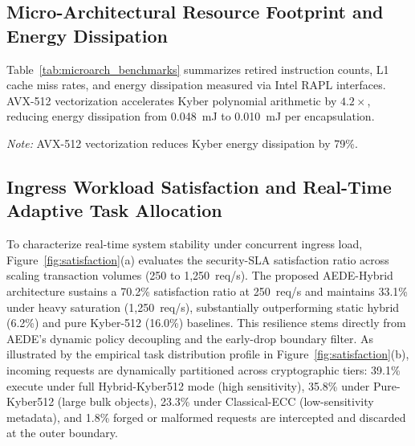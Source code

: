 \documentclass[pdflatex,sn-mathphys,Numbered]{sn-jnl}%
\theoremstyle{thmstyleone}%
\theoremstyle{thmstyletwo}%
\theoremstyle{thmstylethree}%
\begin{document}
\subsection{\textbf{Micro-Architectural Resource Footprint and Energy Dissipation}}
Table~\ref{tab:microarch_benchmarks} summarizes retired instruction counts, L1 cache miss rates, and energy dissipation measured via Intel RAPL interfaces. AVX-512 vectorization accelerates Kyber polynomial arithmetic by $4.2\times$, reducing energy dissipation from 0.048~mJ to 0.010~mJ per encapsulation.

\begin{table}[!htbp]
\centering
\caption{Energy consumption, memory RSS footprint, and instruction count microbenchmarks.}
\label{tab:microarch_benchmarks}
\vspace{0.3em}
\raggedright\small\textit{Note:} AVX-512 vectorization reduces Kyber energy dissipation by 79\%.
\end{table}

\subsection{\textbf{Ingress Workload Satisfaction and Real-Time Adaptive Task Allocation}}
To characterize real-time system stability under concurrent ingress load, Figure~\ref{fig:satisfaction}(a) evaluates the security-SLA satisfaction ratio across scaling transaction volumes (250 to 1,250~req/s). The proposed AEDE-Hybrid architecture sustains a 70.2\% satisfaction ratio at 250~req/s and maintains 33.1\% under heavy saturation (1,250~req/s), substantially outperforming static hybrid (6.2\%) and pure Kyber-512 (16.0\%) baselines. This resilience stems directly from AEDE's dynamic policy decoupling and the early-drop boundary filter. As illustrated by the empirical task distribution profile in Figure~\ref{fig:satisfaction}(b), incoming requests are dynamically partitioned across cryptographic tiers: 39.1\% execute under full Hybrid-Kyber512 mode (high sensitivity), 35.8\% under Pure-Kyber512 (large bulk objects), 23.3\% under Classical-ECC (low-sensitivity metadata), and 1.8\% forged or malformed requests are intercepted and discarded at the outer boundary.
\end{document}
